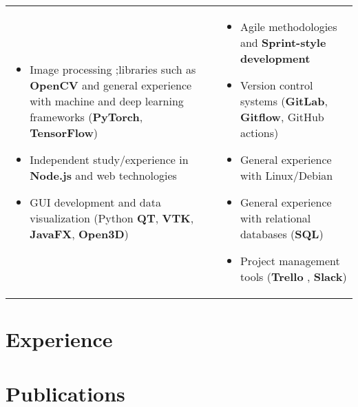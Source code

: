 \documentclass[letterpaper]{twentysecondcv} %
\begin{document}
\begin{tabularx}{\linewidth}{XX}
	\begin{itemize}
		\item Image processing ;libraries such as \textbf{OpenCV} and general experience with machine and deep learning frameworks (\textbf{PyTorch}, \textbf{TensorFlow})
		\item Independent study/experience in \textbf{Node.js} and web technologies
		\item GUI development and data visualization (Python \textbf{QT}, \textbf{VTK}, \textbf{JavaFX}, \textbf{Open3D})
	\end{itemize} & 
	\begin{itemize}
		\item Agile methodologies and \textbf{Sprint-style development}
		\item Version control systems (\textbf{GitLab}, \textbf{Gitflow}, GitHub actions)
		\item General experience with Linux/Debian
		\item General experience with relational databases (\textbf{SQL})
		\item Project management tools (\textbf{Trello} , \textbf{Slack})
	\end{itemize} \\
\end{tabularx}





\section*{Experience}

\experience





\section*{Publications}

\publications
\end{document}
